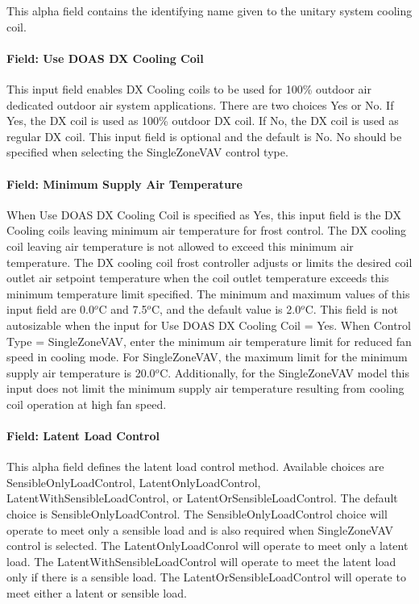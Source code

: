 This alpha field contains the identifying name given to the unitary system cooling coil.

\paragraph{Field: Use DOAS DX Cooling Coil}\label{field-use-doas-dx-cooling-coil}

This input field enables DX Cooling coils to be used for 100\% outdoor air dedicated outdoor air system applications. There are two choices Yes or No. If Yes, the DX coil is used as 100\% outdoor DX coil. If No, the DX coil is used as regular DX coil. This input field is optional and the default is No. No should be specified when selecting the SingleZoneVAV control type.

\paragraph{Field: Minimum Supply Air Temperature}\label{field-minimum-supply-air-temperature}

When Use DOAS DX Cooling Coil is specified as Yes, this input field is the DX Cooling coils leaving minimum air temperature for frost control. The DX cooling coil leaving air temperature is not allowed to exceed this minimum air temperature. The DX cooling coil frost controller adjusts or limits the desired coil outlet air setpoint temperature when the coil outlet temperature exceeds this minimum temperature limit specified. The minimum and maximum values of this input field are 0.0\(^{o}\)C and 7.5\(^{o}\)C, and the default value is 2.0\(^{o}\)C. This field is not autosizable when the input for Use DOAS DX Cooling Coil = Yes. When Control Type = SingleZoneVAV, enter the minimum air temperature limit for reduced fan speed in cooling mode. For SingleZoneVAV, the maximum limit for the minimum supply air temperature is 20.0\(^{o}\)C. Additionally, for the SingleZoneVAV model this input does not limit the minimum supply air temperature resulting from cooling coil operation at high fan speed.


\paragraph{Field: Latent Load Control}\label{field-latent-load-control}

This alpha field defines the latent load control method. Available choices are SensibleOnlyLoadControl, LatentOnlyLoadControl, LatentWithSensibleLoadControl, or LatentOrSensibleLoadControl. The default choice is SensibleOnlyLoadControl. The SensibleOnlyLoadControl choice will operate to meet only a sensible load and is also required when SingleZoneVAV control is selected. The LatentOnlyLoadConrol will operate to meet only a latent load. The LatentWithSensibleLoadControl will operate to meet the latent load only if there is a sensible load. The LatentOrSensibleLoadControl will operate to meet either a latent or sensible load.

